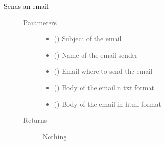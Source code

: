 \documentclass[letterpaper,10pt,english]{sphinxmanual}
\begin{document}

\begin{fulllineitems}
\label{\detokenize{CE_app:CE_app.email.send_email}}
\sphinxAtStartPar
Sends an email
\begin{quote}\begin{description}
\item[{Parameters}] \leavevmode\begin{itemize}
\item {} 
\sphinxAtStartPar
{} () \textendash{} Subject of the email

\item {} 
\sphinxAtStartPar
{} () \textendash{} Name of the email sender

\item {} 
\sphinxAtStartPar
{} () \textendash{} Email where to send the email

\item {} 
\sphinxAtStartPar
{} () \textendash{} Body of the email n txt format

\item {} 
\sphinxAtStartPar
{} () \textendash{} Body of the email in html format

\end{itemize}

\item[{Returns}] \leavevmode
\sphinxAtStartPar
Nothing

\end{description}\end{quote}

\end{fulllineitems}
\end{document}
